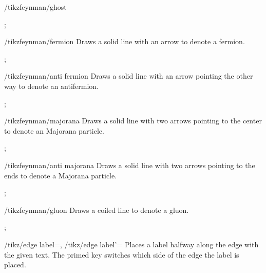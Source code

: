 \documentclass[a4paper,final]{ltxdoc}
\begin{document}
\begin{codeexample}[execute code=false]
\begin{key}{/tikzfeynman/ghost}
\begin{codeexample}[]
;
\end{codeexample}
\end{key}


\begin{key}{/tikzfeynman/fermion}
  Draws a solid line with an arrow to denote a fermion.

\begin{codeexample}[]
;
\end{codeexample}
\end{key}

\begin{key}{/tikzfeynman/anti fermion}
  Draws a solid line with an arrow pointing the other way to denote an antifermion.

\begin{codeexample}[]
;
\end{codeexample}
\end{key}

\begin{key}{/tikzfeynman/majorana}
  Draws a solid line with two arrows pointing to the center to denote an
  Majorana particle.

\begin{codeexample}[]
;
\end{codeexample}
\end{key}

\begin{key}{/tikzfeynman/anti majorana}
  Draws a solid line with two arrows pointing to the ends to denote a Majorana
  particle.

\begin{codeexample}[]
;
\end{codeexample}
\end{key}

\begin{key}{/tikzfeynman/gluon}
  Draws a coiled line to denote a gluon.

\begin{codeexample}[]
;
\end{codeexample}
\end{key}

\begin{keylist}{%
  /tikz/edge label=,
  /tikz/edge label'=}
  Places a label halfway along the edge with the given text.  The primed key
  switches which side of the edge the label is placed.
\end{keylist}


\end{codeexample}
\end{document}
